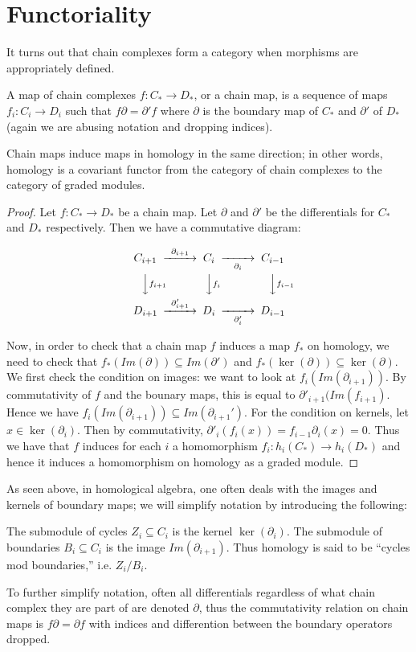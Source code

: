 \section{Functoriality}
It turns out that chain complexes form a category when morphisms
are appropriately defined.
\begin{definition} A map of chain complexes $f:C_*\rightarrow
D_*$, or a chain map, is a sequence of maps $f_i:C_i\rightarrow
D_i$ such that $f\partial = \partial' f$ where $\partial$ is the
boundary map of $C_*$ and $\partial'$ of $D_*$ (again we are
abusing notation and dropping indices). \end{definition}
\begin{theorem} Chain maps induce maps in homology in the same
direction; in other words, homology is a covariant functor from
the category of chain complexes to the category of graded
modules.\end{theorem}
\begin{proof}
Let $f:C_*\rightarrow D_*$ be a chain map. Let $\partial$ and
$\partial'$ be the differentials for $C_*$ and $D_*$
respectively. Then we have a commutative diagram:

\begin{equation}
\begin{CD}
C_{i+1} @>\partial_{i+1}>> C_i @>>\partial_i> C_{i-1}\\
@VV f_{i+1} V          @VV f_i V             @VVf_{i-1} V\\
D_{i+1} @>\partial'_{i+1}>> D_i @>>\partial'_i> D_{i-1}
\end{CD}
\end{equation}

Now, in order to check that a chain map $f$ induces a map $f_*$
on homology, we need to check that $f_*(Im(\partial))\subseteq
Im(\partial')$ and $f_*(\ker(\partial))\subseteq
\ker(\partial)$. We first check the condition on images: we want
to look at $f_i(Im(\partial_{i+1}))$. By commutativity of $f$
and the bounary maps, this is equal to
$\partial'_{i+1}(Im(f_{i+1})$. Hence we have
$f_i(Im(\partial_{i+1}))\subseteq Im(\partial_{i+1}')$. For the
condition on kernels, let $x\in \ker(\partial_i)$. Then by
commutativity, $\partial'_i(f_i(x))=f_{i-1}\partial_i(x)=0$.
Thus we have that $f$ induces for each $i$ a homomorphism
$f_i:h_i(C_*)\rightarrow h_i(D_*)$ and hence it induces a
homomorphism on homology as a graded module. \end{proof}

As seen above, in homological algebra, one often deals with the
images and kernels of boundary maps; we will simplify notation
by introducing the following:
\begin{definition} The submodule of cycles $Z_i\subseteq C_i$ is
the kernel $\ker(\partial_i)$. The submodule of boundaries
$B_i\subseteq C_i$ is the image $Im(\partial_{i+1})$. Thus
homology is said to be ``cycles mod boundaries,'' i.e.
$Z_i/B_i$.\end{definition}
To further simplify notation, often all differentials regardless
of what chain complex they are part of are denoted $\partial$,
thus the commutativity relation on chain maps is
$f\partial=\partial f$ with indices and differention between the
boundary operators dropped.

